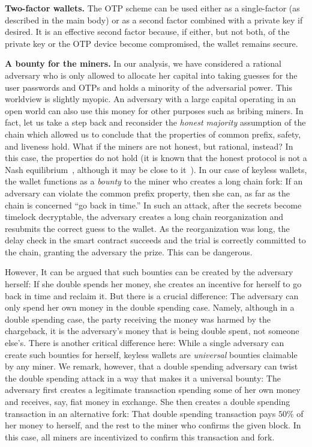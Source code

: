 \noindent
\textbf{Two-factor wallets.}
The OTP scheme can be used either as a single-factor (as described in the main body)
or as a second factor combined
with a private key if desired. It is an effective second factor because,
if either, but not both, of the private key or the OTP device become compromised,
the wallet remains secure.

\noindent
\textbf{A bounty for the miners.}
In our analysis, we have considered a rational adversary who is only allowed
to allocate her capital into taking guesses for the user passwords and OTPs
and holds a minority of the adversarial power. This worldview is
slightly myopic. An adversary with a large capital operating in an open world
can also use this money for other purposes such as bribing miners.
In fact, let us
take a step back and reconsider the
\emph{honest majority} assumption of the chain which allowed us to conclude
that the properties of common prefix, safety, and liveness hold. What if the
miners are not honest, but rational, instead? In this case, the properties
do not hold (it is known that the honest protocol is not a Nash
equilibrium~\cite{selfish}, although it may be close to it~\cite{mining-games}).
In our case of keyless wallets, the wallet functions as a \emph{bounty}
to the miner who creates a long chain fork: If an
adversary can violate the common prefix property, then she can, as far
as the chain is concerned ``go back in time.'' In such an attack,
after the secrets become timelock decryptable, the adversary creates a
long chain reorganization and resubmits the correct guess to the wallet.
As the reorganization was long, the delay check in the smart contract
succeeds and the trial is correctly committed to the chain,
granting the adversary the prize. This can be dangerous.

However, It can be argued that such bounties can be created by the adversary
herself: If she double spends her money, she creates an incentive
for herself to go back in time and reclaim it. But there is
a crucial difference: The adversary can only spend her own money in the double spending
case. Namely, although in a double spending case, the party receiving the
money was harmed by the chargeback, it is the adversary's money that is
being double spent, not someone else's. There is another critical
difference here: While a single adversary can create such bounties for
herself, keyless wallets are \emph{universal} bounties claimable by any miner.
We remark, however, that a double spending adversary
can twist the double spending attack in a way that makes it a universal
bounty: The adversary first
creates a legitimate transaction spending some of her own money and
receives, say, fiat money in exchange. She then creates a double spending
transaction in an alternative fork: That double spending transaction
pays $50\%$ of her money to herself, and the rest to the miner who
confirms the given block. In this case, all miners are incentivized
to confirm this transaction and fork.

